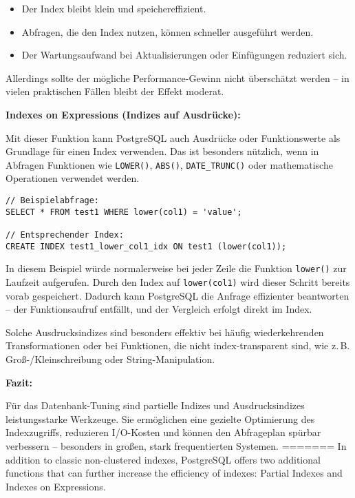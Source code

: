 \documentclass[11pt]{scrartcl}
\begin{document}
\begin{itemize}
  \item Der Index bleibt klein und speichereffizient.
  \item Abfragen, die den Index nutzen, können schneller ausgeführt werden.
  \item Der Wartungsaufwand bei Aktualisierungen oder Einfügungen reduziert sich.
\end{itemize}

Allerdings sollte der mögliche Performance-Gewinn nicht überschätzt werden – in vielen praktischen Fällen bleibt der Effekt moderat.

\vspace{0.5em}
\noindent\textbf{Indexes on Expressions (Indizes auf Ausdrücke):}

Mit dieser Funktion kann PostgreSQL auch Ausdrücke oder Funktionswerte als Grundlage für einen Index verwenden. Das ist besonders nützlich, wenn in Abfragen Funktionen wie \texttt{LOWER()}, \texttt{ABS()}, \texttt{DATE\_TRUNC()} oder mathematische Operationen verwendet werden.

\begin{lstlisting}[style=dbtsql]
// Beispielabfrage:
SELECT * FROM test1 WHERE lower(col1) = 'value';

// Entsprechender Index:
CREATE INDEX test1_lower_col1_idx ON test1 (lower(col1));
\end{lstlisting}

In diesem Beispiel würde normalerweise bei jeder Zeile die Funktion \texttt{lower()} zur Laufzeit aufgerufen. Durch den Index auf \texttt{lower(col1)} wird dieser Schritt bereits vorab gespeichert. Dadurch kann PostgreSQL die Anfrage effizienter beantworten – der Funktionsaufruf entfällt, und der Vergleich erfolgt direkt im Index.

Solche Ausdrucksindizes sind besonders effektiv bei häufig wiederkehrenden Transformationen oder bei Funktionen, die nicht index-transparent sind, wie z.\,B. Groß-/Kleinschreibung oder String-Manipulation.

\vspace{0.5em}
\noindent\textbf{Fazit:}

Für das Datenbank-Tuning sind partielle Indizes und Ausdrucksindizes leistungsstarke Werkzeuge. Sie ermöglichen eine gezielte Optimierung des Indexzugriffs, reduzieren I/O-Kosten und können den Abfrageplan spürbar verbessern – besonders in großen, stark frequentierten Systemen.
=======
In addition to classic non-clustered indexes, PostgreSQL offers two additional functions that can further increase the efficiency of indexes: Partial Indexes and Indexes on Expressions.
\end{document}
